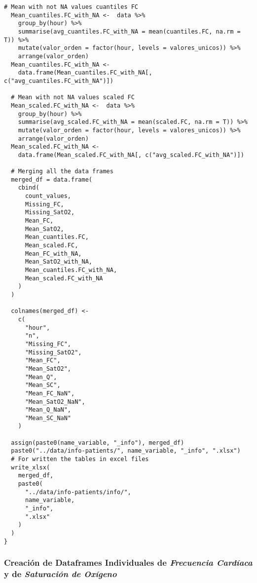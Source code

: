 \begin{lstlisting}[style=mystyle,caption={Cálculo de Medias y Cantidad de Valores Faltantes}, label={lst:medias-y-faltantes}]
  # Mean with not NA values cuantiles FC
  Mean_cuantiles.FC_with_NA <-  data %>%
    group_by(hour) %>%
    summarise(avg_cuantiles.FC_with_NA = mean(cuantiles.FC, na.rm = T)) %>%
    mutate(valor_orden = factor(hour, levels = valores_unicos)) %>%
    arrange(valor_orden)
  Mean_cuantiles.FC_with_NA <-
    data.frame(Mean_cuantiles.FC_with_NA[, c("avg_cuantiles.FC_with_NA")])
  
  # Mean with not NA values scaled FC
  Mean_scaled.FC_with_NA <-  data %>%
    group_by(hour) %>%
    summarise(avg_scaled.FC_with_NA = mean(scaled.FC, na.rm = T)) %>%
    mutate(valor_orden = factor(hour, levels = valores_unicos)) %>%
    arrange(valor_orden)
  Mean_scaled.FC_with_NA <-
    data.frame(Mean_scaled.FC_with_NA[, c("avg_scaled.FC_with_NA")])
  
  # Merging all the data frames
  merged_df = data.frame(
    cbind(
      count_values,
      Missing_FC,
      Missing_SatO2,
      Mean_FC,
      Mean_SatO2,
      Mean_cuantiles.FC,
      Mean_scaled.FC,
      Mean_FC_with_NA,
      Mean_SatO2_with_NA,
      Mean_cuantiles.FC_with_NA,
      Mean_scaled.FC_with_NA
    )
  )
  
  colnames(merged_df) <-
    c(
      "hour",
      "n",
      "Missing_FC",
      "Missing_SatO2",
      "Mean_FC",
      "Mean_SatO2",
      "Mean_Q",
      "Mean_SC",
      "Mean_FC_NaN",
      "Mean_SatO2_NaN",
      "Mean_Q_NaN",
      "Mean_SC_NaN"
    )
  
  assign(paste0(name_variable, "_info"), merged_df)
  paste0("../data/info-patients/", name_variable, "_info", ".xlsx")
  # For written the tables in excel files
  write_xlsx(
    merged_df,
    paste0(
      "../data/info-patients/info/",
      name_variable,
      "_info",
      ".xlsx"
    )
  )
}
\end{lstlisting}


\subsubsection{Creación de Dataframes Individuales de \textit{Frecuencia Cardíaca} y de \textit{Saturación de Oxígeno} }~\label{sec:anexo2-dataframes}

